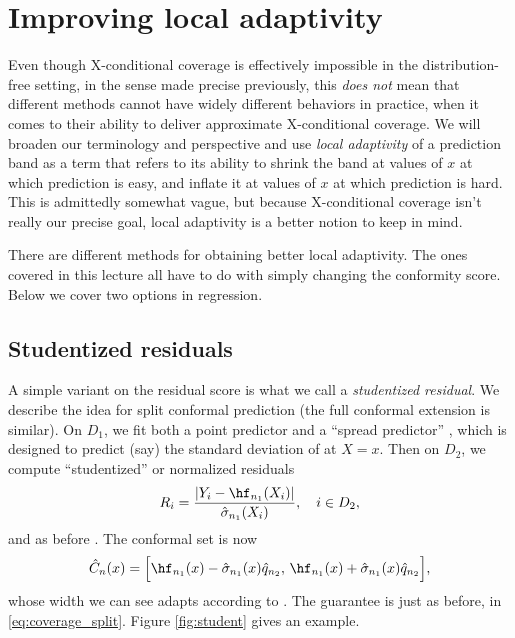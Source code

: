 \documentclass{article}
\begin{document}
\section{Improving local adaptivity}
\label{sec:local_adaptivity}

Even though X-conditional coverage is effectively impossible in the
distribution-free setting, in the sense made precise previously, this \emph{does
  not} mean that different methods cannot have widely different behaviors in
practice, when it comes to their ability to deliver approximate X-conditional
coverage. We will broaden our terminology and perspective and use \emph{local
  adaptivity} of a prediction band as a term that refers to its ability to
shrink the band at values of $x$ at which prediction is easy, and inflate it at
values of $x$ at which prediction is hard. This is admittedly somewhat vague,
but because X-conditional coverage isn't really our precise goal, local
adaptivity is a better notion to keep in mind.

There are different methods for obtaining better local adaptivity. The ones
covered in this lecture all have to do with simply changing the conformity
score. Below we cover two options in regression. 

\subsection{Studentized residuals}

A simple variant on the residual score is what we call a \emph{studentized
  residual}. We describe the idea for split conformal prediction (the full
conformal extension is similar). On $D_1$, we fit both a point predictor
 and a ``spread predictor'' , which 
is designed to predict (say) the standard deviation of  at $X = x$. Then on $D_2$, we compute ``studentized'' or 
normalized residuals 
\[
R_i = \frac{|Y_i - \hf_{n_1}(X_i)|}{\hat\sigma_{n_1}(X_i)}, \quad i \in D_2, 
\]
and as before . The conformal set is now   
\begin{equation}
\label{eq:cset_std_split}
\hC_n(x) = \Big[ \hf_{n_1}(x) - \hat\sigma_{n_1}(x) \hq_{n_2}, \, 
\hf_{n_1}(x) + \hat\sigma_{n_1}(x) \hq_{n_2} \Big],   
\end{equation}
whose width we can see adapts according to . The
guarantee is just as before, in \eqref{eq:coverage_split}. Figure
\ref{fig:student} gives an example.  
\end{document}
